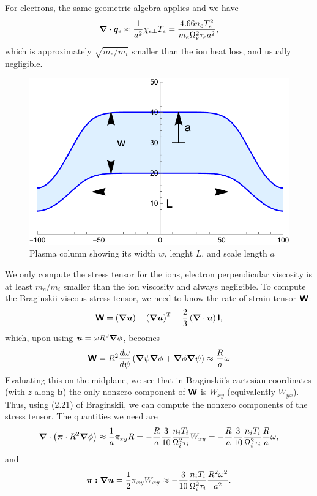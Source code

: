 \documentclass{revtex4}
\providecommand{\pitens}{\tensor{\pi}}
\begin{document}
For electrons, the same geometric algebra applies and we have
\begin{equation}
\dv{\bm{q}_e} \approx \frac{1}{a^2} \chi_{e\perp} T_e = \frac{4.66 n_e T_e^2}{m_e \cycfreq[e]^2 \tau_e a^2},
\end{equation}
which is approximately $\sqrt{m_e/m_i}$ smaller than the ion heat loss, and usually negligible.

\begin{figure}
\includegraphics{ScaleLengths.pdf}
\caption{Plasma column showing its width $w$, lenght $L$, and scale length $a$}
\label{scales}
\end{figure}

We only compute the stress tensor for the ions, electron perpendicular viscosity is at least $m_e/m_i$ smaller than the ion viscosity and always negligible.
To compute the Braginskii viscous stress tensor, we need to know the rate of strain tensor $\tensor{W}$:
\begin{equation}
\tensor{W} = \left(\grad\bm{u}\right) + \left(\grad\bm{u}\right)^{T} - \frac{2}{3} \left(\dv\bm{u}\right)\idmat,
\end{equation}
which, upon using $\bm{u} = \omega R^2 \grad\tor$, becomes
\begin{equation}
\tensor{W} = R^2 \frac{d \omega}{d\psi} \left( \grad\psi \grad \tor + \grad \tor \grad \psi\right) \approx \frac{R}{a} \omega
\end{equation}
Evaluating this on the midplane, we see that in Braginskii's cartesian coordinates (with $z$ along $\bm{b}$) the only nonzero component of $\tensor{W}$ is $W_{xy}$ (equivalently $W_{yx}$).
Thus, using (2.21) of Braginskii, we can compute the nonzero components of the stress tensor. The quantities we need are
\begin{equation}
\dv\left( \pitens\cdot R^2\grad\tor \right) \approx \frac{1}{a} \pi_{xy} R = - \frac{R}{a} \frac{3}{10} \frac{n_i T_i}{\cycfreq[i]^2 \tau_i} W_{xy} = - \frac{R}{a} \frac{3}{10} \frac{n_i T_i}{\cycfreq[i]^2 \tau_i} \frac{R}{a} \omega,
\end{equation}
and
\begin{equation}
\pitens \bm{:}\grad\bm{u} = \frac{1}{2} \pi_{xy} W_{xy} \approx - \frac{3}{10} \frac{n_i T_i}{\cycfreq[i]^2 \tau_i}\frac{R^2\omega^2}{a^2}.
\end{equation}
\end{document}
